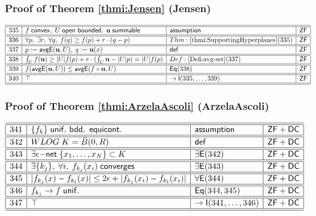 \documentclass[11pt,reqno]{amsart}
\begin{document}
\medskip

\subsubsection*{Proof of Theorem \ref{thmi:Jensen} (\textsf{Jensen})}

\noindent$%
\begin{array}{|r|l|l|l|}
\hline\hline
335 & f\;\mathsf{convex},\;U\;\mathsf{open\ bounded},\;\mathbf{u}\;\mathsf{summable} & \mathsf{assumption} & \mathsf{ZF} \\ \hline\hline
336 & \forall p,\;\exists r,\;\forall q,\;f(q)\ge f(p)+r\cdot(q-p) & Thm:\ref{thmi:SupportingHyperplanes}(335) & \mathsf{ZF} \\ \hline\hline
337 & p:=\mathsf{avgE}(\mathbf{u},U),\;q:=\mathbf{u}(x) & \mathsf{def} & \mathsf{ZF} \\ \hline\hline
338 & \int_{U}f(\mathbf{u})\ge|U|f(p)+r\cdot(\int_{U}\mathbf{u}-|U|p)=|U|f(p) & Def:\ref{Defi:avg-set}(337) & \mathsf{ZF} \\ \hline\hline
339 & f(\mathsf{avgE}(\mathbf{u},U))\le\mathsf{avgE}(f\circ\mathbf{u},U) & \mathsf{Eq}(338) & \mathsf{ZF} \\ \hline\hline
340 & \top & \to\mathsf{I}(335,\dots,339) & \mathsf{ZF} \\ \hline\hline
\end{array}%
$

\medskip

\subsubsection*{Proof of Theorem \ref{thmi:ArzelaAscoli} (\textsf{ArzelaAscoli})}

\noindent$%
\begin{array}{|r|l|l|l|}
\hline\hline
341 & \{f_{k}\}\;\mathsf{unif.\ bdd,\ equicont.} & \mathsf{assumption} & \mathsf{ZF+DC} \\ \hline\hline
342 & WLOG\;K=\bar{B}(0,R) & \mathsf{def} & \mathsf{ZF+DC} \\ \hline\hline
343 & \exists\epsilon\mathsf{-net}\;\{x_{1},\dots,x_{N}\}\subset K & \exists\mathsf{E}(342) & \mathsf{ZF+DC} \\ \hline\hline
344 & \exists\{k_{j}\},\;\forall i,\;f_{k_{j}}(x_{i})\;\mathsf{converges} & \exists\mathsf{E}(343) & \mathsf{ZF+DC} \\ \hline\hline
345 & |f_{k_{j}}(x)-f_{k_{l}}(x)|\le2\epsilon+|f_{k_{j}}(x_{i})-f_{k_{l}}(x_{i})| & \forall\mathsf{E}(344) & \mathsf{ZF+DC} \\ \hline\hline
346 & f_{k_{j}}\to f\;\mathsf{unif.} & \mathsf{Eq}(344,345) & \mathsf{ZF+DC} \\ \hline\hline
347 & \top & \to\mathsf{I}(341,\dots,346) & \mathsf{ZF+DC} \\ \hline\hline
\end{array}%
$
\end{document}
